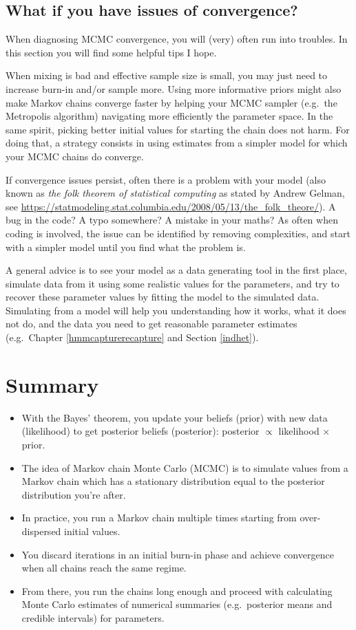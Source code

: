 \documentclass[
  12pt,
]{krantz}
\begin{document}
\subsection{What if you have issues of convergence?}\label{what-if-you-have-issues-of-convergence}

When diagnosing MCMC convergence, you will (very) often run into troubles. In this section you will find some helpful tips I hope.

When mixing is bad and effective sample size is small, you may just need to increase burn-in and/or sample more. Using more informative priors might also make Markov chains converge faster by helping your MCMC sampler (e.g.~the Metropolis algorithm) navigating more efficiently the parameter space. In the same spirit, picking better initial values for starting the chain does not harm. For doing that, a strategy consists in using estimates from a simpler model for which your MCMC chains do converge.

If convergence issues persist, often there is a problem with your model (also known as \emph{the folk theorem of statistical computing} as stated by Andrew Gelman, see \url{https://statmodeling.stat.columbia.edu/2008/05/13/the_folk_theore/}). A bug in the code? A typo somewhere? A mistake in your maths? As often when coding is involved, the issue can be identified by removing complexities, and start with a simpler model until you find what the problem is.

A general advice is to see your model as a data generating tool in the first place, simulate data from it using some realistic values for the parameters, and try to recover these parameter values by fitting the model to the simulated data. Simulating from a model will help you understanding how it works, what it does not do, and the data you need to get reasonable parameter estimates (e.g.~Chapter \ref{hmmcapturerecapture} and Section \ref{indhet}).

\section{Summary}\label{summary}

\begin{itemize}
\item
  With the Bayes' theorem, you update your beliefs (prior) with new data (likelihood) to get posterior beliefs (posterior): posterior \(\propto\) likelihood \(\times\) prior.
\item
  The idea of Markov chain Monte Carlo (MCMC) is to simulate values from a Markov chain which has a stationary distribution equal to the posterior distribution you're after.
\item
  In practice, you run a Markov chain multiple times starting from over-dispersed initial values.
\item
  You discard iterations in an initial burn-in phase and achieve convergence when all chains reach the same regime.
\item
  From there, you run the chains long enough and proceed with calculating Monte Carlo estimates of numerical summaries (e.g.~posterior means and credible intervals) for parameters.
\end{itemize}
\end{document}
